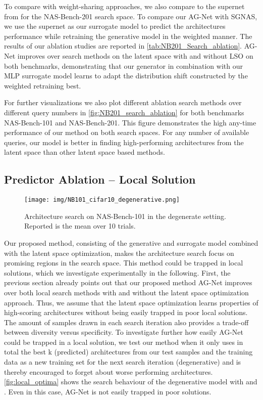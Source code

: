 \documentclass[runningheads]{llncs}
\begin{document}
To compare with weight-sharing approaches, we also compare to the supernet from \cite{2021SGNAS} for the NAS-Bench-201 search space.
To compare our AG-Net with SGNAS, we use the supernet as our surrogate model to predict the architectures performance while retraining the generative model in the weighted manner. 
The results of our ablation studies are reported in \autoref{tab:NB201_Search_ablation}.
AG-Net improves over search methods on the latent space with and without LSO on both benchmarks, demonstrating that our generator in combination with our MLP surrogate model learns to adapt the distribution shift constructed by the weighted retraining best.

For further visualizations we also plot different ablation search methods over different query numbers in \autoref{fig:NB201_search_ablation} for both benchmarks NAS-Bench-101 and NAS-Bench-201.
This figure demonstrates the high any-time performance of our method on both search spaces.
For any number of available queries, our model is better in finding high-performing architectures from the latent space than other latent space based methods. 

\subsection{Predictor Ablation -- Local Solution}
\begin{figure}
	\centering
	\texttt{[image: img/NB101\_cifar10\_degenerative.png]}
	\caption{Architecture search on NAS-Bench-101 in the degenerate setting. Reported is the mean over 10 trials.
		\label{fig:local_optima}}
\end{figure}
Our proposed method, consisting of the generative and surrogate model combined with the latent space optimization, makes the architecture search focus on promising regions in the search space. This method could be trapped in local solutions, which we investigate experimentally in the following. First, the previous section already points out that our proposed method AG-Net improves over both local search methods with and without the latent space optimization approach. Thus, we assume that the latent space optimization learns properties of high-scoring architectures without being easily trapped in poor local solutions. The amount of samples drawn in each search iteration also provides a trade-off between diversity versus specificity. To investigate further how easily AG-Net could be trapped in a local solution, we test our method when it only uses in total the best k (predicted) architectures from our test samples and the training data as a new training set for the next search iteration (degenerative) and is thereby encouraged to forget about worse performing architectures. \autoref{fig:local_optima} shows the search behaviour of the degenerative model with  and . Even in this case, AG-Net is not easily trapped in poor solutions.
\end{document}
